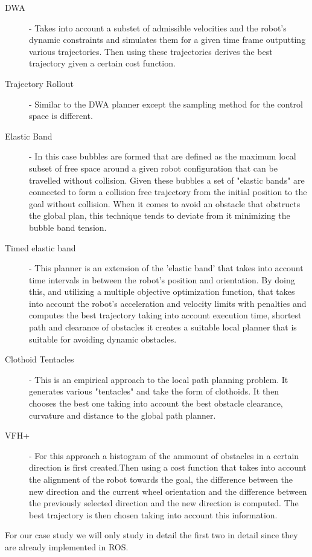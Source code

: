 \begin{description}
    \item [\ac{DWA}] -  \cite{foxdwa} Takes into account a substet of admissible velocities and the robot's dynamic constraints and simulates them for a given time frame outputting various trajectories. Then using these trajectories derives the best trajectory given a certain cost function.  
    \item [Trajectory Rollout]  \cite{gerkey2008planning} - Similar to the \ac{DWA} planner except the sampling method for the control space is different.
    \item [Elastic Band] - \cite{siegwart2011introduction} In this case bubbles are formed that are defined as the maximum local subset of free space around a given robot configuration that can be travelled without collision.
    Given these bubbles a set of "elastic bands" are connected to form a collision free trajectory from the initial position to the goal without collision. When it comes to avoid an obstacle that obstructs the global plan, this technique tends to deviate from it  minimizing the bubble band tension.
    \item [Timed elastic band] - \cite{rosmann2013efficient} This planner is an extension of the 'elastic band' that takes into account time intervals in between the robot's position and orientation. By doing this, and utilizing a  multiple objective optimization function, that takes into account the robot's acceleration and velocity limits with penalties and computes the best trajectory taking into account execution time, shortest path and clearance of obstacles it creates a suitable local planner that is suitable for avoiding dynamic obstacles.
    
    \item [Clothoid Tentacles] -  \cite{ffalia2015local} This is an empirical approach to the local path planning problem. It generates various "tentacles" and take the form of clothoids. It then chooses the best one taking into account the best obstacle clearance, curvature and distance to the global path planner. 
    
    \item [\ac{VFH}+] \cite{siegwart2011introduction} - For this approach a histogram of the ammount of obstacles in a certain direction is first created.Then using a cost function that takes into account the alignment of the robot towards the goal, the difference between the new direction and the current wheel orientation and the difference between the previously selected direction and the new direction is computed. The best trajectory is then chosen taking into account this information.
    
\end{description}
For our case study we will only study in detail the first two in detail since they are already implemented in ROS.
